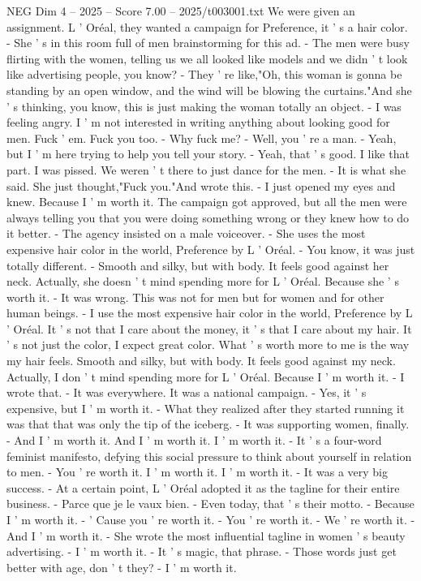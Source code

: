 \begin{textsample}{NEG Dim 4 – 2025 – Score 7.00 – 2025/t003001.txt}
We were given an assignment.
L ' Oréal, they wanted a campaign for Preference, it ' s a hair color. - She ' s in this room full of men brainstorming for this ad. - The men were busy flirting with the women, telling us we all looked like models and we didn ' t look like advertising people, you know? - They ' re like,"Oh, this woman is gonna be standing by an open window, and the wind will be blowing the curtains."And she ' s thinking, you know, this is just making the woman totally an object. - I was feeling angry.
I ' m not interested in writing anything about looking good for men.
Fuck ' em.
Fuck you too. - Why fuck me? - Well, you ' re a man. - Yeah, but I ' m here trying to help you tell your story. - Yeah, that ' s good.
I like that part.
I was pissed.
We weren ' t there to just dance for the men. - It is what she said.
She just thought,"Fuck you."And wrote this. - I just opened my eyes and knew.
Because I ' m worth it.
The campaign got approved, but all the men were always telling you that you were doing something wrong or they knew how to do it better. - The agency insisted on a male voiceover. - She uses the most expensive hair color in the world, Preference by L ' Oréal. - You know, it was just totally different. - Smooth and silky, but with body.
It feels good against her neck.
Actually, she doesn ' t mind spending more for L ' Oréal.
Because she ' s worth it. - It was wrong.
This was not for men but for women and for other human beings. - I use the most expensive hair color in the world, Preference by L ' Oréal.
It ' s not that I care about the money, it ' s that I care about my hair.
It ' s not just the color, I expect great color.
What ' s worth more to me is the way my hair feels.
Smooth and silky, but with body.
It feels good against my neck.
Actually, I don ' t mind spending more for L ' Oréal.
Because I ' m worth it. - I wrote that. - It was everywhere.
It was a national campaign. - Yes, it ' s expensive, but I ' m worth it. - What they realized after they started running it was that that was only the tip of the iceberg. - It was supporting women, finally. - And I ' m worth it.
And I ' m worth it.
I ' m worth it. - It ' s a four-word feminist manifesto, defying this social pressure to think about yourself in relation to men. - You ' re worth it.
I ' m worth it.
I ' m worth it. - It was a very big success. - At a certain point, L ' Oréal adopted it as the tagline for their entire business. - Parce que je le vaux bien. - Even today, that ' s their motto. - Because I ' m worth it. - ' Cause you ' re worth it. - You ' re worth it. - We ' re worth it. - And I ' m worth it. - She wrote the most influential tagline in women ' s beauty advertising. - I ' m worth it. - It ' s magic, that phrase. - Those words just get better with age, don ' t they? - I ' m worth it.

\end{textsample}
